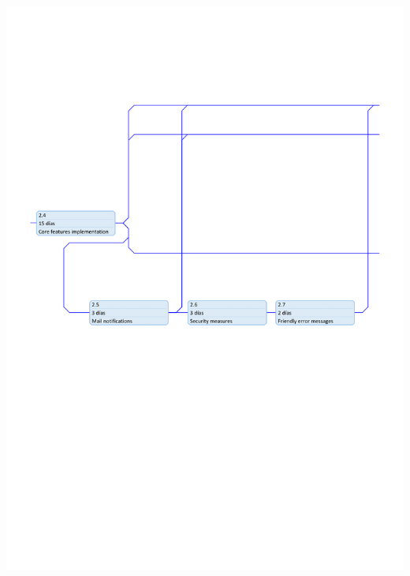 \documentclass{DeustoFDP}
\begin{document}
\begin{center}
	\includegraphics[width=1\linewidth]{fig/precedence-2}
\end{center}
\end{document}
